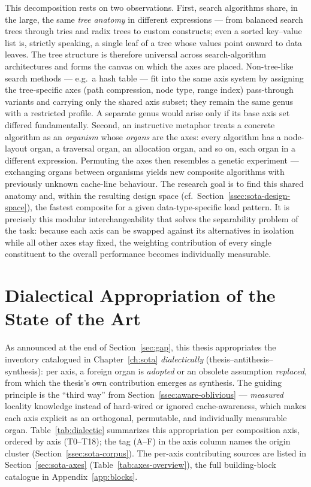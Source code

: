 This decomposition rests on two observations. First, search algorithms share, in the large, the same
\emph{tree anatomy} in different expressions --- from balanced search trees through tries and radix
trees to custom constructs; even a sorted key--value list is, strictly speaking, a single leaf of a
tree whose values point onward to data leaves. The tree structure is therefore universal across
search-algorithm architectures and forms the canvas on which the axes are placed. Non-tree-like
search methods --- e.g.\ a hash table --- fit into the same axis system by assigning the
tree-specific axes (path compression, node type, range index) pass-through variants and carrying
only the shared axis subset; they remain the same genus with a restricted profile. A separate genus
would arise only if its base axis set differed fundamentally. Second, an instructive metaphor treats
a concrete algorithm as an \emph{organism} whose \emph{organs} are the axes: every algorithm has a
node-layout organ, a traversal organ, an allocation organ, and so on, each organ in a different
expression. Permuting the axes then resembles a genetic experiment --- exchanging organs between
organisms yields new composite algorithms with previously unknown cache-line behaviour. The research
goal is to find this shared anatomy and, within the resulting design
space (cf.\ Section~\ref{ssec:sota-design-space}), the fastest composite for a given
data-type-specific load pattern. It is precisely this modular interchangeability that solves the
separability problem of the task: because each axis can be swapped against its alternatives in
isolation while all other axes stay fixed, the weighting contribution of every single constituent to
the overall performance becomes individually measurable.

\section{Dialectical Appropriation of the State of the Art}\label{sec:dialectic}

As announced at the end of Section~\ref{sec:gap}, this thesis appropriates the inventory catalogued
in Chapter~\ref{ch:sota} \emph{dialectically} (thesis--antithesis--synthesis): per axis, a foreign
organ is \emph{adopted} or an obsolete assumption \emph{replaced}, from which the thesis's own
contribution emerges as synthesis. The guiding principle is the \enquote{third way} from
Section~\ref{ssec:aware-oblivious} --- \emph{measured} locality knowledge instead of hard-wired or
ignored cache-awareness, which makes each axis explicit as an orthogonal, permutable, and
individually measurable organ. Table~\ref{tab:dialectic} summarizes this
appropriation per composition axis, ordered by axis (T0--T18); the tag (A--F) in the axis column
names the origin cluster (Section~\ref{ssec:sota-corpus}). The per-axis contributing sources are listed in
Section~\ref{sec:sota-axes} (Table~\ref{tab:axes-overview}), the full building-block catalogue in
Appendix~\ref{app:blocks}.

